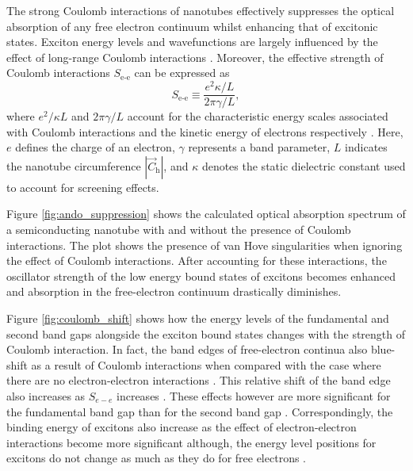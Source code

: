 The strong Coulomb interactions of nanotubes effectively suppresses the optical absorption of any free electron continuum whilst enhancing that of excitonic states. Exciton energy levels and wavefunctions are largely influenced by the effect of long-range Coulomb interactions \cite{ando2006effects}. Moreover, the effective strength of Coulomb interactions $S_\text{e-e}$ can be expressed as
%
\begin{equation}
	S_\text{e-e} \equiv \dfrac{e^2 \kappa / L}{2 \pi \gamma / L},
\end{equation}
%
where $e^2 /\kappa L$ and $2 \pi \gamma / L$ account for the characteristic energy scales associated with Coulomb interactions and the kinetic energy of electrons respectively \cite{ando2005theory}. Here, $e$ defines the charge of an electron, $\gamma$ represents a band parameter, $L$ indicates the nanotube circumference $|\vec{C}_\text{h}|$, and $\kappa$ denotes the static dielectric constant used to account for screening effects.


Figure \ref{fig:ando_suppression} shows the calculated optical absorption spectrum of a semiconducting nanotube with and without the presence of Coulomb interactions. The plot shows the presence of van Hove singularities when ignoring the effect of Coulomb interactions. After accounting for these interactions, the oscillator strength of the low energy bound states of excitons becomes enhanced and absorption in the free-electron continuum drastically diminishes.

Figure \ref{fig:coulomb_shift} shows how the energy levels of the fundamental and second band gaps alongside the exciton bound states changes with the strength of Coulomb interaction. In fact, the band edges of free-electron continua also blue-shift as a result of Coulomb interactions when compared with the case where there are no electron-electron interactions \cite{ando1997excitons}. This relative shift of the band edge also increases as $S_{e-e}$ increases \cite{ando2005theory}. These effects however are more significant for the fundamental band gap than for the second band gap \cite{ando2005theory}. Correspondingly, the binding energy of excitons also increase as the effect of electron-electron interactions become more significant although, the energy level positions for excitons do not change as much as they do for free electrons \cite{ando2005theory}.

